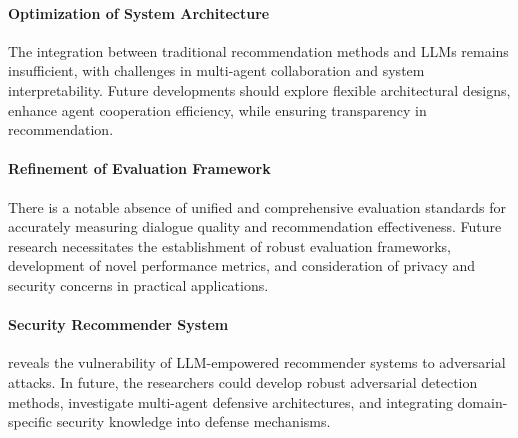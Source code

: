 \paragraph{Optimization of System Architecture} The integration between traditional recommendation methods and LLMs remains insufficient, with challenges in multi-agent collaboration and system interpretability. Future developments should explore flexible architectural designs, enhance agent cooperation efficiency, while ensuring transparency in recommendation.

\paragraph{Refinement of Evaluation Framework} There is a notable absence of unified and comprehensive evaluation standards for accurately measuring dialogue quality and recommendation effectiveness. Future research necessitates the establishment of robust evaluation frameworks, development of novel performance metrics, and consideration of privacy and security concerns in practical applications.

\paragraph{Security Recommender System} \cite{ning2024cheatagent} reveals the vulnerability of LLM-empowered recommender systems to adversarial attacks. In future,  the researchers could develop robust adversarial detection methods, investigate multi-agent defensive architectures, and integrating domain-specific security knowledge into defense mechanisms.